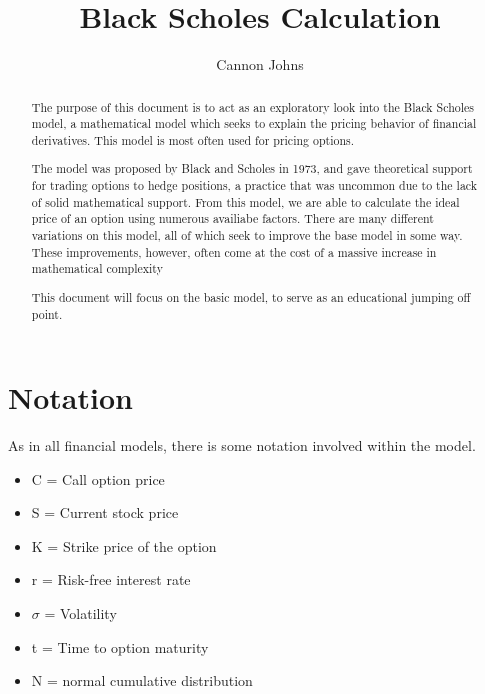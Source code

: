 \documentclass[a4paper,10pt]{article}
\title{Black Scholes Calculation}
\author{Cannon Johns}
\begin{document}
\maketitle

\begin{abstract}

The purpose of this document is to act as an exploratory look into the Black Scholes model, a mathematical model which seeks to explain the pricing behavior of financial derivatives. This model is most often used for pricing options.

The model was proposed by Black and Scholes in 1973, and gave theoretical support for trading options to hedge positions, a practice that was uncommon due to the lack of solid mathematical support. From this model, we are able to calculate the ideal price of an option using numerous availiabe factors. There are many different variations on this model, all of which seek to improve the base model in some way. These improvements, however, often come at the cost of a massive increase in mathematical complexity

This document will focus on the basic model, to serve as an educational jumping off point.

\end{abstract}

\section{Notation}
As in all financial models, there is some notation involved within the model.

\begin{itemize}
 \item[] C = Call option price 
 \item[] S = Current stock price
 \item[] K = Strike price of the option
 \item[] r = Risk-free interest rate
 \item[] $\sigma$ = Volatility
 \item[] t = Time to option maturity
 \item[] N = normal cumulative distribution
\end{itemize}
\end{document}
